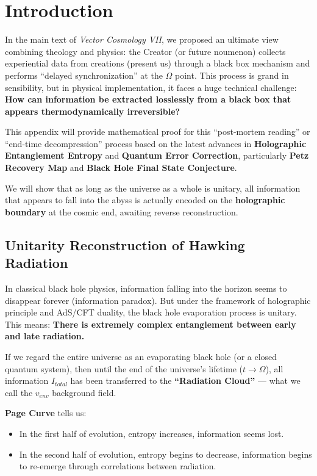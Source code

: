 \section{Introduction}

In the main text of \textit{Vector Cosmology VII}, we proposed an ultimate view combining theology and physics: the Creator (or future noumenon) collects experiential data from creations (present us) through a black box mechanism and performs ``delayed synchronization'' at the $\Omega$ point. This process is grand in sensibility, but in physical implementation, it faces a huge technical challenge: \textbf{How can information be extracted losslessly from a black box that appears thermodynamically irreversible?}

This appendix will provide mathematical proof for this ``post-mortem reading'' or ``end-time decompression'' process based on the latest advances in \textbf{Holographic Entanglement Entropy} and \textbf{Quantum Error Correction}, particularly \textbf{Petz Recovery Map} and \textbf{Black Hole Final State Conjecture}.

We will show that as long as the universe as a whole is unitary, all information that appears to fall into the abyss is actually encoded on the \textbf{holographic boundary} at the cosmic end, awaiting reverse reconstruction.

\subsection{Unitarity Reconstruction of Hawking Radiation}

In classical black hole physics, information falling into the horizon seems to disappear forever (information paradox). But under the framework of holographic principle and AdS/CFT duality, the black hole evaporation process is unitary. This means: \textbf{There is extremely complex entanglement between early and late radiation.}

If we regard the entire universe as an evaporating black hole (or a closed quantum system), then until the end of the universe's lifetime ($t \to \Omega$), all information $I_{total}$ has been transferred to the \textbf{``Radiation Cloud''} --- what we call the $v_{env}$ background field.

\textbf{Page Curve} tells us:

\begin{itemize}
\item In the first half of evolution, entropy increases, information seems lost.

\item In the second half of evolution, entropy begins to decrease, information begins to re-emerge through correlations between radiation.
\end{itemize}

